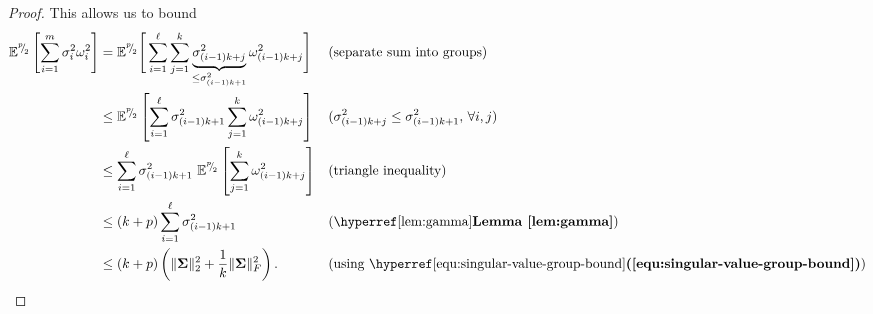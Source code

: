 \begin{proof}
    This allows us to bound
    \begin{align}
        \mathbb{E}^{\sfrac{p}{2}}\left[ \sum_{i=1}^{m} \sigma_i^2 \omega_i^2 \right]
        &= \mathbb{E}^{\sfrac{p}{2}}\Bigg[ \sum_{i=1}^{\ell} \sum_{j=1}^{k} \underbrace{\sigma_{(i-1)k + j}^2}_{\leq \sigma_{(i-1)k + 1}^2} \omega_{(i-1)k + j}^2 \Bigg] && \text{(separate sum into groups)} \notag \\
        &\leq \mathbb{E}^{\sfrac{p}{2}}\left[ \sum_{i=1}^{\ell} \sigma_{(i-1)k + 1}^2 \sum_{j=1}^{k} \omega_{(i-1)k + j}^2 \right] && \text{($\sigma_{(i-1)k + j}^2 \leq \sigma_{(i-1)k + 1}^2$, $\forall i, j$)} \notag \\
        &\leq \sum_{i=1}^{\ell} \sigma_{(i-1)k + 1}^2 ~ \mathbb{E}^{\sfrac{p}{2}}\left[ \sum_{j=1}^{k} \omega_{(i-1)k + j}^2 \right] && \text{(triangle inequality)} \notag \\
        &\leq (k + p) \sum_{i=1}^{\ell} \sigma_{(i-1)k + 1}^2 && \text{(\reflem{lem:gamma})} \notag \\
        &\leq (k + p) \left( \lVert \mtx{\Sigma} \rVert _2^2 + \frac{1}{k} \lVert \mtx{\Sigma} \rVert _F^2 \right). && \text{(using \refequ{equ:singular-value-group-bound})}
    \end{align}
    

\end{proof}

